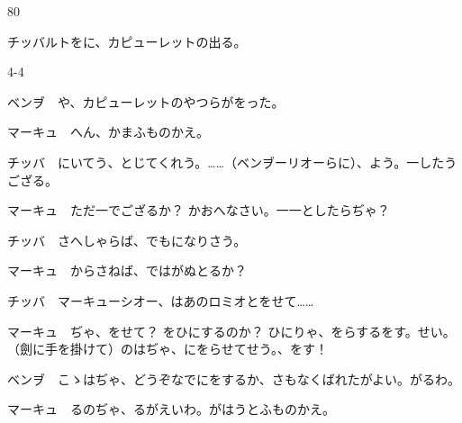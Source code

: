 \documentclass[tate,paper=b6j,jafontsize=9pt]{jlreq}
\begin{document}
\begin{azconvIndented}{8\zw}{0\zw}

チッバルトをに、カピューレットの出る。

\end{azconvIndented}
\begin{azconvIndented}{4\zw}{-4\zw}

ベンヺ　や、カピューレットのやつらがをった。

マーキュ　へん、かまふものかえ。

チッバ　にいてう、とじてくれう。……（ベンヺーリオーらに）、よう。一したうござる。

マーキュ　ただ一でござるか？ かおへなさい。一一としたらぢゃ？

チッバ　さへしゃらば、でもになりさう。

マーキュ　からさねば、ではがぬとるか？

チッバ　マーキューシオー、はあのロミオとをせて……

マーキュ　ぢゃ、をせて？ をひにするのか？ ひにりゃ、をらするをす。せい。（劍に手を掛けて）のはぢゃ、にをらせてせう。、をす！

ベンヺ　こゝはぢゃ、どうぞなでにをするか、さもなくばれたがよい。がるわ。

マーキュ　るのぢゃ、るがえいわ。がはうとふものかえ。

\end{azconvIndented}
\end{document}
